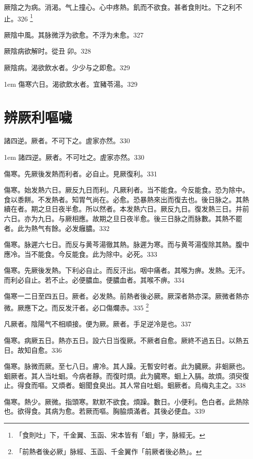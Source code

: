 厥陰之为病。消渴。气上撞{\khaaitp 心}。心中疼熱。飢而不欲食。{\khaaitp 甚者}食則吐。下之利不止。326
	\footnote{「食則吐」下，千金翼、玉函、宋本皆有「蛔」字，脉經无。}

厥陰中風。其脉微浮为欲愈。不浮为未愈。327

厥陰病欲解时。從丑{\sungtpii 𥁞}卯。328

厥陰病。渴欲飲水者。少少与之即愈。329

\hangindent 1em
傷寒六日。渴欲飲水者。宜豬苓湯。{\gaoben}329

\chapter{辨厥利嘔噦}

諸四逆。厥者。不可下之。虗家亦然。330

\hangindent 1em
諸四逆。厥者。不可吐之。虗家亦然。330

傷寒。先厥後发熱而利者。必自止。見厥復利。331

傷寒。始发熱六日。厥反九日而利。凡厥利者。当不能食。今反能食。恐为除中。食以黍餅。不发熱者。知胃气尚在。必愈。恐暴熱來出而復去也。後日脉之。其熱續在者。期之旦日夜半愈。所以然者。本发熱六日。厥反九日。復发熱三日。并前六日。亦为九日。与厥相應。故期之旦日夜半愈。後三日脉之而脉數。其熱不罷者。此为熱气有餘。必发癰膿。332

傷寒。脉遲六七日。而反与黄芩湯徹其熱。脉遲为寒。而与黄芩湯復除其熱。腹中應冷。当不能食。今反能食。此为除中。必死。333

傷寒。先厥後发熱。下利必自止。而反汗出。咽中痛者。其喉为痹。发熱。无汗。而利必自止。若不止。必便膿血。便膿血者。其喉不痹。334

傷寒一二日至四五日。厥者。必发熱。前熱者後必厥。厥深者熱亦深。厥微者熱亦微。厥應下之。而反发汗者。必口傷爛赤。335
	\footnote{「前熱者後必厥」脉經、玉函、千金翼作「前厥者後必熱」。}

凡厥者。陰陽气不相順接。便为厥。厥者。手足逆冷是也。337

傷寒。病厥五日。熱亦五日。設六日当復厥。不厥者自愈。厥終不過五日。以熱五日。故知自愈。336

傷寒。脉微而厥。至七八日。膚冷。其人躁。无暫安时者。此为臓厥。非蛔厥也。蛔厥者。其人当吐蛔。今病者靜。而復时煩。此为臓寒。蛔上入膈。故煩。須臾復止。得食而嘔。又煩者。蛔聞食臭出。其人常自吐蛔。蛔厥者。烏梅丸主之。338

傷寒。熱少。厥微。指頭寒。默默不欲食。煩躁。數日。小便利。色白者。此熱除也。欲得食。其病为愈。若厥而嘔。胸脇煩滿者。其後必便血。339


